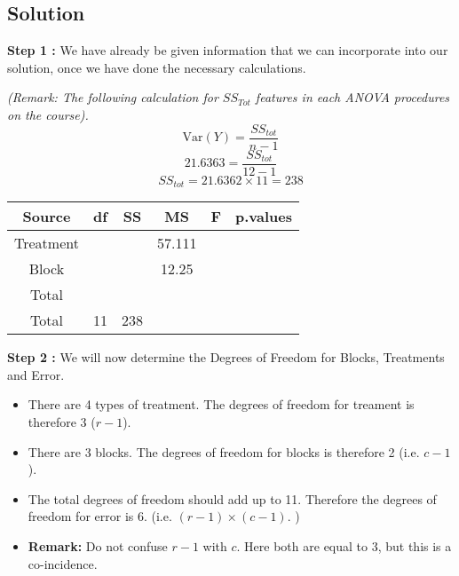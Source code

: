 \documentclass[12pt]{article}
\begin{document}
\subsection*{Solution}


\noindent \textbf{Step 1 :} We have already be given information that we can incorporate into our solution, once we have done the necessary calculations.

\bigskip
\noindent \textit{(Remark: The following calculation for $SS_{Tot}$ features in each ANOVA procedures on the course).}
\[\textrm{Var}(Y) = \frac{ SS_{tot}}{n-1} \]
\[ 21.6363 = \frac{ SS_{tot}}{12-1} \]
\[ SS_{tot} = 21.6362 \times 11 = 238 \]
{
	\Large
	\begin{center}
		\begin{tabular}{|c|c|c|c|c|c|}
			\hline Source	       &	df	&	SS	&	MS	&	F	&	p.values	\\ \hline
			Treatment      &		&		&	57.111	&		&		\\ \hline
			Block	&		\phantom{spa}		&	\phantom{spa}		&	12.25	&		&		\\ \hline
			Total	&		&		&		\phantom{spa}		&	\phantom{spa}		&		\\ \hline 
			Total	&	11	&	238	&		&		&		\\ \hline  
		\end{tabular}
	\end{center}
}

\bigskip

\noindent \textbf{Step 2 :} We will now determine the Degrees of Freedom for Blocks, Treatments and Error.

\begin{itemize}
	\item There are 4 types of treatment. The degrees of freedom for treament is therefore 3 ($r-1$).
	\item There are 3 blocks. The degrees of freedom for blocks is therefore 2 (i.e. $c-1$). 
	\item The total degrees of freedom should add up to 11. Therefore the degrees of freedom for error is 6.
	(i.e. $(r-1)\times (c-1)$. )
	\item \textbf{Remark:} Do not confuse $r-1$ with $c$. Here both are equal to 3, but this is a co-incidence.
\end{itemize}
\end{document}

